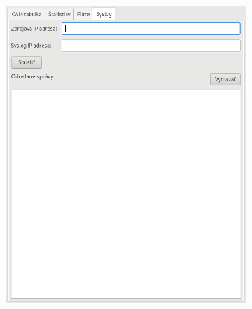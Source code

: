 \documentclass[12pt, a4paper]{article}
\begin{document}
\begin{figure}[h!]
\begin{subfigure}{0.45\textwidth}
\end{subfigure}
\hfill
\begin{subfigure}{0.45\textwidth}
	\centering
	\includegraphics[width=\textwidth]{assets/syslog.png}
\end{subfigure}
\end{figure}
\end{document}
